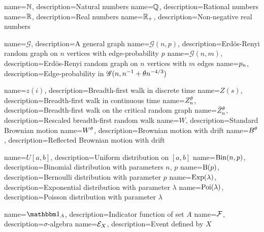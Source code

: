 
\usepackage[nopostdot, nonumberlist, toc, style = super]{glossaries}
\makenoidxglossaries 

{
	name={$\mathbb{N}$},
	description={Natural numbers}
}
{
	name={$\mathbb{Q}$},
	description={Rational numbers}
}
{
	name={$\mathbb{R}$},
	description={Real numbers}
}
{
	name={$\mathbb{R}_+$},
	description={Non-negative real numbers}
}


{
	name={$\mathcal{G}$},
	description={A general graph}
}
{
	name={$\mathscr{G}(n,p)$},
	description={Erd\"os-Renyi random graph on $n$ vertices with edge-probability $p$}
}
{
	name={$\mathscr{G}(n,m)$},
	description={Erd\"os-Renyi random graph on $n$ vertices with $m$ edges}
}
{
	name={$p_n$},
	description={Edge-probability in $\mathscr{G}(n, n^{-1} + \theta n^{-4/3})$}
}

{
	name={$z(i)$},
	description={Breadth-first walk in discrete time}
}
{
	name={$Z(s)$},
	description={Breadth-first walk in continuous time}
}
{
	name={$Z_n^{\theta}$},
	description={Breadth-first walk on the critical random graph}
}
{
	name={$\bar{Z}^{\theta}_n$},
	description={Rescaled breadth-first random walk}
}
{
	name={$W$},
	description={Standard Brownian motion}
}
{
	name={$W^{\theta}$},
	description={Brownian motion with drift}
}
{
	name={$B^{\theta}$},
	description={Reflected Brownian motion with drift}
}

{
	name={$U[a,b]$},
	description={Uniform distribution on $[a,b]$}
}
{
	name={$\operatorname*{Bin}(n,p)$},
	description={Binomial distribution with parameters $n$, $p$}
}
{
	name={$\operatorname*{B}(p)$},
	description={Bernoulli distribution with parameter $p$}
}
{
	name={$\operatorname*{Exp}(\lambda)$},
	description={Exponential distribution with parameter $\lambda$}
}
{
	name={$\operatorname*{Poi}(\lambda)$},
	description={Poisson distribution with parameter $\lambda$}
}

{
	name={$\Ind{A}$},
	description={Indicator function of set $A$}
}
{
	name={$\mathcal{F}$},
	description={$\sigma$-algebra}
}
{
	name={$\mathcal{E}_{X}$},
	description={Event defined by $X$}
}

